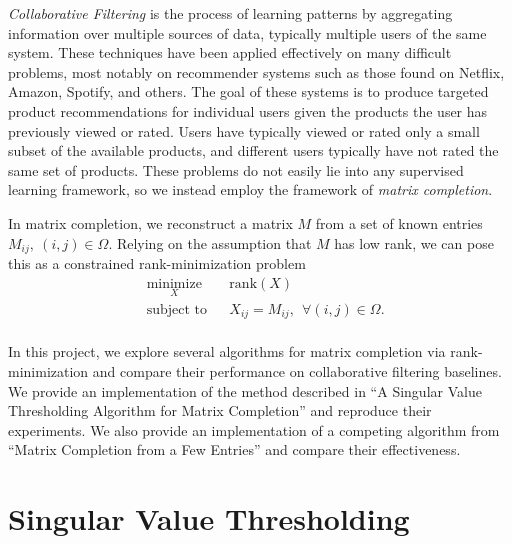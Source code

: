 \documentclass{article} %
\begin{document}
\emph{Collaborative Filtering} is the process of learning patterns by
aggregating information over multiple sources of data, typically
multiple users of the same system. These techniques have been applied
effectively on many difficult problems, most notably on recommender
systems such as those found on Netflix, Amazon, Spotify, and others.
The goal of these systems is to produce targeted product
recommendations for individual users given the products the user has
previously viewed or rated. Users have typically viewed or rated only
a small subset of the available products, and different users
typically have not rated the same set of products. These problems do
not easily lie into any supervised learning framework, so we instead
employ the framework of \emph{matrix completion}.

In matrix completion, we reconstruct a matrix $M$ from a set of known
entries $M_{ij}, \ (i,j) \in \Omega$. Relying on the assumption that
$M$ has low rank, we can pose this as a constrained rank-minimization
problem
\begin{equation*}
\begin{aligned}
  & \underset{X}{\text{minimize}} & & \mathrm{rank}(X) \\
  & \text{subject to}             & & X_{ij} = M_{ij}, \ \ \forall (i, j)
  \in \Omega. \\
\end{aligned}
\end{equation*}

In this project, we explore several algorithms for matrix completion
via rank-minimization and compare their performance on collaborative
filtering baselines. We provide an implementation of the method
described in ``A Singular Value Thresholding Algorithm for Matrix
Completion'' \cite{cai2010singular} and reproduce their experiments.
We also provide an implementation of a competing algorithm from
``Matrix Completion from a Few Entries'' \cite{keshavan2010matrix} and
compare their effectiveness.



\section{Singular Value Thresholding}
\end{document}
